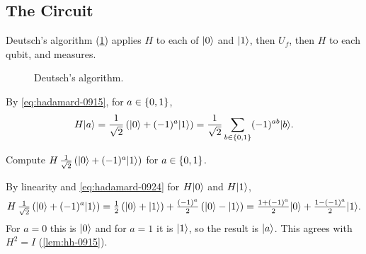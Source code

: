 \subsection{The Circuit}

Deutsch's algorithm (\cref{fig:deutsch-0924}) applies $H$ to each of $\lvert 0 \rangle$ and $\lvert 1 \rangle$, then
$U_f$, then $H$ to each qubit, and measures.

\begin{figure}[ht]
    \centering
    \caption{Deutsch's algorithm.}
    \label{fig:deutsch-0924}
\end{figure}

By \cref{eq:hadamard-0915}, for $a \in \left\lbrace0,1\right\rbrace$,
\begin{equation}\label{eq:hadamard-0924}
    H\lvert a \rangle = \frac{1}{\sqrt{2}}\left(\lvert 0 \rangle + (-1)^{a}\lvert 1 \rangle\right)
    = \frac{1}{\sqrt{2}} \sum_{b \in \left\lbrace0,1\right\rbrace} (-1)^{ab} \lvert b \rangle.
\end{equation}

\begin{exercisebox}
\begin{exercise}\label{ex:hback-0924}
    Compute $H \, \frac{1}{\sqrt{2}}\left(\lvert 0 \rangle + (-1)^{a}\lvert 1 \rangle\right)$ for $a \in \left\lbrace0,1\right\rbrace$.
\end{exercise}
\tcblower
\begin{wsolution}
    By linearity and \cref{eq:hadamard-0924} for $H\lvert 0 \rangle$ and $H\lvert 1 \rangle$,
    \[H \, \tfrac{1}{\sqrt{2}}\left(\lvert 0 \rangle + (-1)^{a}\lvert 1 \rangle\right)
        = \tfrac{1}{2}\left(\lvert 0 \rangle + \lvert 1 \rangle\right) + \tfrac{(-1)^{a}}{2}\left(\lvert 0 \rangle - \lvert 1 \rangle\right)
        = \tfrac{1 + (-1)^{a}}{2}\lvert 0 \rangle + \tfrac{1 - (-1)^{a}}{2}\lvert 1 \rangle.\]
    For $a = 0$ this is $\lvert 0 \rangle$ and for $a = 1$ it is $\lvert 1 \rangle$, so the result is $\lvert a \rangle$. This
    agrees with $H^2 = I$ (\cref{lem:hh-0915}).
\end{wsolution}
\end{exercisebox}

